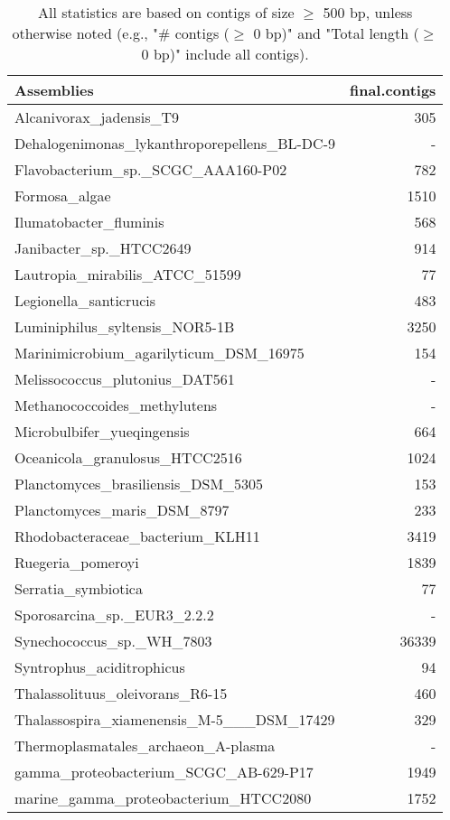 \documentclass[12pt,a4paper]{article}
\begin{document}
\begin{table}[ht]
\begin{center}
\caption{All statistics are based on contigs of size $\geq$ 500 bp, unless otherwise noted (e.g., "\# contigs ($\geq$ 0 bp)" and "Total length ($\geq$ 0 bp)" include all contigs).}
\begin{tabular}{|l*{1}{|r}|}
\hline
Assemblies & final.contigs \\ \hline
Alcanivorax\_jadensis\_T9 & 305 \\ \hline
Dehalogenimonas\_lykanthroporepellens\_BL-DC-9 & - \\ \hline
Flavobacterium\_sp.\_SCGC\_AAA160-P02 & 782 \\ \hline
Formosa\_algae & 1510 \\ \hline
Ilumatobacter\_fluminis & 568 \\ \hline
Janibacter\_sp.\_HTCC2649 & 914 \\ \hline
Lautropia\_mirabilis\_ATCC\_51599 & 77 \\ \hline
Legionella\_santicrucis & 483 \\ \hline
Luminiphilus\_syltensis\_NOR5-1B & 3250 \\ \hline
Marinimicrobium\_agarilyticum\_DSM\_16975 & 154 \\ \hline
Melissococcus\_plutonius\_DAT561 & - \\ \hline
Methanococcoides\_methylutens & - \\ \hline
Microbulbifer\_yueqingensis & 664 \\ \hline
Oceanicola\_granulosus\_HTCC2516 & 1024 \\ \hline
Planctomyces\_brasiliensis\_DSM\_5305 & 153 \\ \hline
Planctomyces\_maris\_DSM\_8797 & 233 \\ \hline
Rhodobacteraceae\_bacterium\_KLH11 & 3419 \\ \hline
Ruegeria\_pomeroyi & 1839 \\ \hline
Serratia\_symbiotica & 77 \\ \hline
Sporosarcina\_sp.\_EUR3\_2.2.2 & - \\ \hline
Synechococcus\_sp.\_WH\_7803 & 36339 \\ \hline
Syntrophus\_aciditrophicus & 94 \\ \hline
Thalassolituus\_oleivorans\_R6-15 & 460 \\ \hline
Thalassospira\_xiamenensis\_M-5\_\_\_DSM\_17429 & 329 \\ \hline
Thermoplasmatales\_archaeon\_A-plasma & - \\ \hline
gamma\_proteobacterium\_SCGC\_AB-629-P17 & 1949 \\ \hline
marine\_gamma\_proteobacterium\_HTCC2080 & 1752 \\ \hline
\end{tabular}
\end{center}
\end{table}
\end{document}
